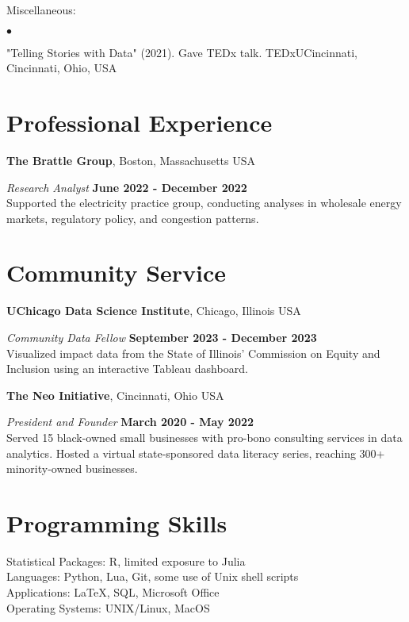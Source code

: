 \documentclass[margin,line]{res}
\newenvironment{list2}{
  \begin{list}{$\bullet$}{%
      \setlength{\itemsep}{0in}
      \setlength{\parsep}{0in} \setlength{\parskip}{0in}
      \setlength{\topsep}{0in} \setlength{\partopsep}{0in} 
      \setlength{\leftmargin}{0.2in}}}{\end{list}}
\begin{document}
\begin{resume}
Miscellaneous:
\begin{list2}
\item "Telling Stories with Data" (2021). Gave TEDx talk. TEDxUCincinnati, Cincinnati, Ohio, USA 
\end{list2}


\section{\sc Professional Experience}
{\bf The Brattle Group}, Boston, Massachusetts USA

\vspace{-.3cm}
{\em Research Analyst} \hfill {\bf June 2022 - December 2022}\\
Supported the electricity practice group, conducting analyses in wholesale energy markets, regulatory policy, and congestion patterns. 


\section{\sc Community Service}
{\bf UChicago Data Science Institute}, Chicago, Illinois USA

\vspace{-.3cm}
{\em Community Data Fellow} \hfill {\bf September 2023 - December 2023}\\
Visualized impact data from the State of Illinois' Commission on Equity and Inclusion using an interactive Tableau dashboard. 

{\bf The Neo Initiative}, Cincinnati, Ohio USA

\vspace{-.3cm}
{\em President and Founder} \hfill {\bf March 2020 -  May 2022}\\
Served 15 black-owned small businesses with pro-bono consulting services in data analytics. Hosted a virtual state-sponsored data literacy series, reaching 300+ minority-owned businesses. 

\section{\sc Programming Skills} 
Statistical Packages:  R, limited exposure to Julia \\ 
Languages:  Python, Lua, Git, some use of Unix shell scripts \\ 
Applications: \LaTeX, SQL, Microsoft Office \\
Operating Systems:  UNIX/Linux, MacOS 


\end{resume}
\end{document}
